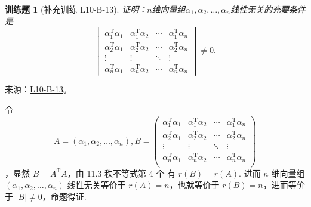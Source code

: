 \documentclass[12pt,fontset=fandol]{ctexart}
\newtheorem{exercise}{训练题}[section]
\begin{document}
\begin{exercise}[补充训练 L10-B-13]\label{prob:L10-B-13}
证明：$n$维向量组$\alpha_1,\alpha_2,\ldots,\alpha_n$线性无关的充要条件是
        \[\begin{vmatrix}
                \alpha_1^\mathrm{T}\alpha_1 & \alpha_1^\mathrm{T}\alpha_2 & \cdots & \alpha_1^\mathrm{T}\alpha_n \\
                \alpha_2^\mathrm{T}\alpha_1 & \alpha_2^\mathrm{T}\alpha_2 & \cdots & \alpha_2^\mathrm{T}\alpha_n \\
                \vdots                      & \vdots                      & \ddots & \vdots                      \\
                \alpha_n^\mathrm{T}\alpha_1 & \alpha_n^\mathrm{T}\alpha_2 & \cdots & \alpha_n^\mathrm{T}\alpha_n
            \end{vmatrix}\neq 0.\]
\end{exercise}
\noindent 来源：\href{https://github.com/yhwu-is/Linear-Algebra-Left-Undone/blob/new/%E8%AE%B2%E4%B9%89/%E4%B8%93%E9%A2%98/10%20%E8%A1%8C%E5%88%97%E5%BC%8F.tex}{L10-B-13}。
\begin{solve}
令 
\[A = (\alpha_1, \alpha_2, \ldots, \alpha_n), B = \begin{pmatrix}
                \alpha_1^{\mathrm{T}}\alpha_1 & \alpha_1^{\mathrm{T}}\alpha_2 & \cdots & \alpha_1^{\mathrm{T}}\alpha_n \\
                \alpha_2^{\mathrm{T}}\alpha_1 & \alpha_2^{\mathrm{T}}\alpha_2 & \cdots & \alpha_2^{\mathrm{T}}\alpha_n \\
                \vdots                        & \vdots                        & \ddots & \vdots                        \\
                \alpha_n^{\mathrm{T}}\alpha_1 & \alpha_n^{\mathrm{T}}\alpha_2 & \cdots & \alpha_n^{\mathrm{T}}\alpha_n \\
            \end{pmatrix}\]
，显然 $B = A^{\mathrm{T}}A$，由 {11.3 秩不等式第 4 个} 有 $r(B) = r(A)$. 进而 $n$ 维向量组 $(\alpha_1, \alpha_2, \ldots, \alpha_n)$ 线性无关等价于 $r(A) = n$，也就等价于 $r(B) = n$，进而等价于 $\lvert B \rvert \neq 0$，命题得证.
\end{solve}
\end{document}
